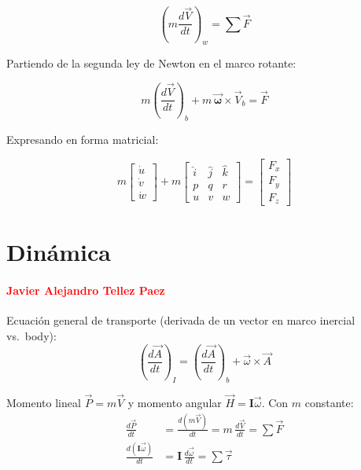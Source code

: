 \documentclass[11pt,a4paper]{article}
\begin{document}
\begin{equation}
 \left(m \frac{d\vec{V}}{dt} \right)_w = \sum \vec{F}
\end{equation}

Partiendo de la segunda ley de Newton en el marco rotante:

\begin{equation}
m \left( \frac{d\vec{V}}{dt} \right)_b + m \, \vec{\boldsymbol{\omega}} \times \vec{V}_b = \vec{F}
\end{equation}

Expresando en forma matricial:

\begin{equation}
m
\begin{bmatrix}
\dot{u} \\
\dot{v} \\
\dot{w}
\end{bmatrix}
+
m
\begin{bmatrix}
\hat{i} & \hat{j} & \hat{k} \\
p & q & r \\
u & v & w
\end{bmatrix}
=
\begin{bmatrix}
F_x \\
F_y \\
F_z
\end{bmatrix}
\end{equation}


\section*{Dinámica}
\paragraph{\textcolor{red} {Javier Alejandro Tellez Paez}}
Ecuación general de transporte (derivada de un vector en marco inercial vs.\ body):
\begin{equation}
\left(\frac{d\vec{A}}{dt}\right)_{I}=\left(\frac{d\vec{A}}{dt}\right)_{b}+\vec{\omega}\times\vec{A}
\end{equation}

Momento lineal $\vec{P}=m\vec{V}$ y momento angular $\vec{H}=\mathbf{I}\vec{\omega}$. Con $m$ constante:
\begin{align}
\frac{d\vec{P}}{dt}&=\frac{d(m\vec{V})}{dt}=m\,\frac{d\vec{V}}{dt}=\sum \vec{F}\\[4pt]
\frac{d(\mathbf{I}\vec{\omega})}{dt}&=\mathbf{I}\,\frac{d\vec{\omega}}{dt}=\sum \vec{\tau}
\end{align}
\end{document}
